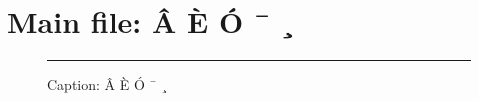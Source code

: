 \documentclass{article}
\begin{document}
\tableofcontents
\listoffigures

\section{Main file: Â È Ó ¯ ¸}


\begin{figure}[b]
\centering\rule{1em}{1em}
\caption{Caption:  Â È Ó ¯ ¸}
\end{figure}
\end{document}
